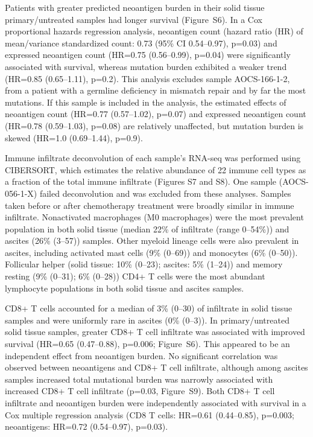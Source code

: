 \documentclass{bmcart}
\begin{document}
Patients with greater predicted neoantigen burden in their solid tissue primary/untreated samples had longer survival (Figure~S6). In a Cox proportional hazards regression analysis, neoantigen count (hazard ratio (HR) of mean/variance standardized count: 0.73 (95\% CI 0.54--0.97), p=0.03) and expressed neoantigen count (HR=0.75 (0.56--0.99), p=0.04) were significantly associated with survival, whereas mutation burden exhibited a weaker trend (HR=0.85 (0.65--1.11), p=0.2). This analysis excludes sample AOCS-166-1-2, from a patient with a germline deficiency in mismatch repair and by far the most mutations. If this sample is included in the analysis, the estimated effects of neoantigen count (HR=0.77 (0.57--1.02), p=0.07) and expressed neoantigen count (HR=0.78 (0.59--1.03), p=0.08) are relatively unaffected, but mutation burden is skewed (HR=1.0 (0.69--1.44), p=0.9).

Immune infiltrate deconvolution of each sample's RNA-seq was performed using CIBERSORT, which estimates the relative abundance of 22 immune cell types as a fraction of the total immune infiltrate (Figures S7 and S8). One sample (AOCS-056-1-X) failed deconvolution and was excluded from these analyses. Samples taken before or after chemotherapy treatment were broadly similar in immune infiltrate. Nonactivated macrophages (M0 macrophages) were the most prevalent population in both solid tissue (median 22\% of infiltrate (range 0--54\%)) and ascites (26\% (3--57)) samples. Other myeloid lineage cells were also prevalent in ascites, including activated mast cells (9\% (0--69)) and monocytes (6\% (0--50)). Follicular helper (solid tissue: 10\% (0--23); ascites: 5\% (1--24)) and memory resting (9\% (0--31); 6\% (0--28)) CD4+ T cells were the most abundant lymphocyte populations in both solid tissue and ascites samples.


CD8+ T cells accounted for a median of 3\% (0--30) of infiltrate in solid tissue samples and were uniformly rare in ascites (0\% (0--3)). In primary/untreated solid tissue samples, greater CD8+ T cell infiltrate was associated with improved survival (HR=0.65 (0.47--0.88), p=0.006; Figure~S6). This appeared to be an independent effect from neoantigen burden. No significant correlation was observed between neoantigens and CD8+ T cell infiltrate, although among ascites samples increased total mutational burden was narrowly associated with increased CD8+ T cell infiltrate (p=0.03, Figure~S9). Both CD8+ T cell infiltrate and neoantigen burden were independently associated with survival in a Cox multiple regression analysis (CD8 T cells: HR=0.61 (0.44--0.85), p=0.003; neoantigens: HR=0.72 (0.54--0.97), p=0.03).
\end{document}
